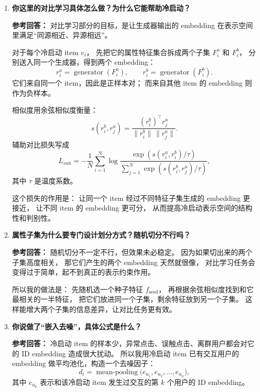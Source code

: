 \documentclass[11pt,a4paper]{ctexart}
\begin{document}
\begin{enumerate}[leftmargin=*, label=\textbf{Q\arabic*.}]
\textbf{参考回答：}
不用 ID embedding 相似度，是因为新 item 的 ID embedding 还没训好，甚至接近随机初始化，
这时候拿它去做相似检索不可靠。

所以我用的是 \textbf{属性相似}。
做法比较朴素但稳定：对每个老 item 和当前冷启动 item，比对它们的属性值是否相同，
相同一个属性就加一分，最后按得分排序，取前 $K$ 个。
这种做法虽然简单，但优点是可解释、鲁棒，而且在冷启动阶段比基于未训练好的 ID 表示更可靠。

\item \textbf{你这里的对比学习具体怎么做？为什么它能帮助冷启动？}

\textbf{参考回答：}
对比学习部分的目标，是让生成器输出的 embedding 在表示空间里满足“同源相近、异源相远”。

对于每个冷启动 item $v_i$，
先把它的属性特征集合拆成两个子集 $F_i^a$ 和 $F_i^b$，
分别送入同一个生成器，得到两个 embedding：
\[
r_i^a = \operatorname{generator}(F_i^a),\qquad
r_i^b = \operatorname{generator}(F_i^b).
\]
它们来自同一个 item，因此是正样本对；
而来自其他 item 的 embedding 则作为负样本。

相似度用余弦相似度衡量：
\[
s(r_i^b, r_j^a)
=
\frac{(r_i^b)^\top r_j^a}{\|r_i^b\|\,\|r_j^a\|}.
\]
辅助对比损失写成
\[
L_{\text{aux}}
=
-\frac{1}{N}
\sum_{i=1}^{N}
\log
\frac{
\exp\!\left(s(r_i^a,r_i^b)/\tau\right)
}{
\sum_{j=1}^{N}\exp\!\left(s(r_i^b,r_j^a)/\tau\right)
},
\]
其中 $\tau$ 是温度系数。

这个损失的作用是：
让同一个 item 经过不同特征子集生成的 embedding 更接近，
让不同 item 的 embedding 更可分，
从而提高冷启动表示空间的结构性和判别性。

\item \textbf{属性子集为什么要专门设计划分方式？随机切分不行吗？}

\textbf{参考回答：}
随机切分不一定不行，但效果未必稳定。
因为如果切出来的两个子集高度相关，
那它们产生的两个 embedding 天然就很像，
对比学习任务会变得过于简单，起不到真正的表示约束作用。

所以我的做法是：
先随机选一个种子特征 $f_{\text{seed}}$，
再根据余弦相似度找到和它最相关的一半特征，
把它们放进同一个子集，剩余特征放到另一个子集。
这样能增大两个子集的信息差异，让对比任务更有效。

\item \textbf{你说做了“嵌入去噪”，具体公式是什么？}

\textbf{参考回答：}
冷启动 item 的样本少，异常点击、误触点击、离群用户都会对它的 ID embedding 造成很大扰动。
所以我用冷启动 item 已有交互用户的 embedding 做平均池化，构造一个去噪因子：
\[
d_i = \operatorname{mean\mbox{-}pooling}
\bigl(
e_{u_1}, e_{u_2}, \dots, e_{u_n}
\bigr),
\]
其中 $e_{u_k}$ 表示和该冷启动 item 发生过交互的第 $k$ 个用户的 ID embedding。


\end{enumerate}
\end{document}
